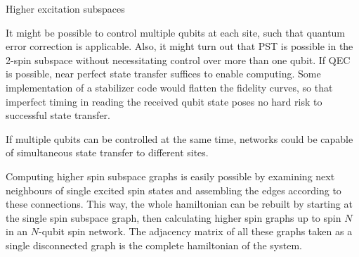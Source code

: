 {\begin{frame}{Higher excitation subspaces}
\end{frame}}

\begin{center}
\end{center}

\noindent It might be possible to control multiple qubits at each site, such that quantum error correction is applicable. Also, it might turn out that PST is possible in the 2-spin subspace without necessitating control over more than one qubit. If QEC is possible, near perfect state transfer suffices to enable computing. Some implementation of a stabilizer code would flatten the fidelity curves, so that imperfect timing in reading the received qubit state poses no hard risk to successful state transfer.\par
If multiple qubits can be controlled at the same time, networks could be capable of simultaneous state transfer to different sites.\par
Computing higher spin subspace graphs is easily possible by examining next neighbours of single excited spin states and assembling the edges according to these connections. This way, the whole hamiltonian can be rebuilt by starting at the single spin subspace graph, then calculating higher spin graphs up to spin $N$ in an $N$-qubit spin network. The adjacency matrix of all these graphs taken as a single disconnected graph is the complete hamiltonian of the system.

